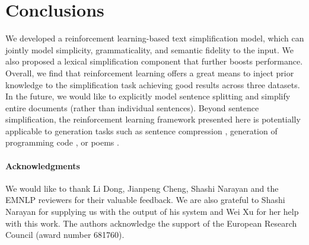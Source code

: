 \documentclass[11pt,letterpaper]{article}
\begin{document}
\section{Conclusions}
We developed a reinforcement learning-based text simplification model,
which can jointly model simplicity, grammaticality, and semantic
fidelity to the input.  We also proposed a lexical simplification
component that further boosts performance. Overall, we find that
reinforcement learning offers a great means to inject prior knowledge
to the simplification task achieving good results across three
datasets. In the future, we would like to explicitly model sentence
splitting and simplify entire documents (rather than individual
sentences).  Beyond sentence simplification, the reinforcement
learning framework presented here is potentially applicable to
generation tasks such as sentence compression
\cite{chopra-auli-rush:2016:N16-1}, generation of programming code
\cite{ling-EtAl:2016:P16-1}, or poems
\cite{zhang-lapata:2014:EMNLP2014}.

\paragraph{Acknowledgments} We would like to thank Li Dong, Jianpeng
Cheng, Shashi Narayan and the EMNLP reviewers for their valuable
feedback. We are also grateful to Shashi Narayan for supplying us with
the output of his system and Wei Xu for her help with this work. The
authors acknowledge the support of the European Research Council
(award number 681760).



\end{document}
